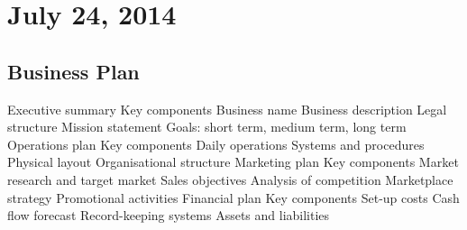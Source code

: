 \section{July 24, 2014}

\subsection{Business Plan}
\begin{outline}
\1 Executive summary
\2 Key components
\3 Business name
\3 Business description
\3 Legal structure
\3 Mission statement
\3 Goals: short term, medium term, long term
\1 Operations plan
\2 Key components
\3 Daily operations
\3 Systems and procedures
\3 Physical layout
\3 Organisational structure
\1 Marketing plan
\2 Key components
\3 Market research and target market
\3 Sales objectives
\3 Analysis of competition
\3 Marketplace strategy
\3 Promotional activities
\1 Financial plan
\2 Key components
\3 Set-up costs
\3 Cash flow forecast
\3 Record-keeping systems
\3 Assets and liabilities
\end{outline}
